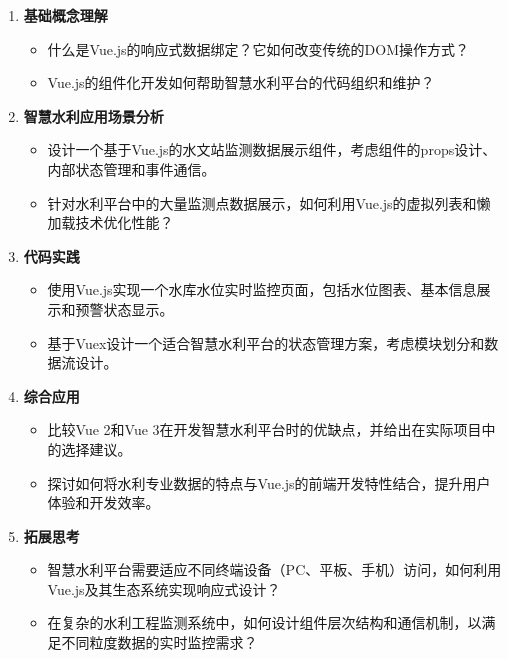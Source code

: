 \begin{enumerate}
\def\labelenumi{\arabic{enumi}.}
\tightlist
\item
  \textbf{基础概念理解}

  \begin{itemize}
  \tightlist
  \item
    什么是Vue.js的响应式数据绑定？它如何改变传统的DOM操作方式？
  \item
    Vue.js的组件化开发如何帮助智慧水利平台的代码组织和维护？
  \end{itemize}
\item
  \textbf{智慧水利应用场景分析}

  \begin{itemize}
  \tightlist
  \item
    设计一个基于Vue.js的水文站监测数据展示组件，考虑组件的props设计、内部状态管理和事件通信。
  \item
    针对水利平台中的大量监测点数据展示，如何利用Vue.js的虚拟列表和懒加载技术优化性能？
  \end{itemize}
\item
  \textbf{代码实践}

  \begin{itemize}
  \tightlist
  \item
    使用Vue.js实现一个水库水位实时监控页面，包括水位图表、基本信息展示和预警状态显示。
  \item
    基于Vuex设计一个适合智慧水利平台的状态管理方案，考虑模块划分和数据流设计。
  \end{itemize}
\item
  \textbf{综合应用}

  \begin{itemize}
  \tightlist
  \item
    比较Vue 2和Vue
    3在开发智慧水利平台时的优缺点，并给出在实际项目中的选择建议。
  \item
    探讨如何将水利专业数据的特点与Vue.js的前端开发特性结合，提升用户体验和开发效率。
  \end{itemize}
\item
  \textbf{拓展思考}

  \begin{itemize}
  \tightlist
  \item
    智慧水利平台需要适应不同终端设备（PC、平板、手机）访问，如何利用Vue.js及其生态系统实现响应式设计？
  \item
    在复杂的水利工程监测系统中，如何设计组件层次结构和通信机制，以满足不同粒度数据的实时监控需求？
  \end{itemize}
\end{enumerate}

